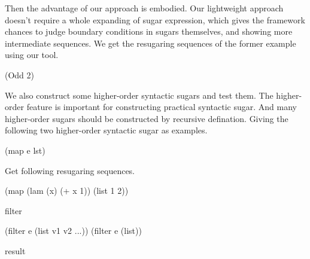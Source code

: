 Then the advantage of our approach is embodied. Our lightweight approach doesn't require a whole expanding of sugar expression, which gives the framework chances to judge boundary conditions in sugars themselves, and showing more intermediate sequences. We get the resugaring sequences of the former example using our tool.
\begin{Codes}
    (Odd 2)
\end{Codes}
				

We also construct some higher-order syntactic sugars and test them. The higher-order feature is important for constructing practical syntactic sugar. And many higher-order sugars should be constructed by recursive defination. Giving the following two higher-order syntactic sugar as examples.
\begin{Codes}
    (map e lst)
\end{Codes}
Get following resugaring sequences.
\begin{Codes}
    (map (lam (x) (+ x 1)) (list 1 2))
\end{Codes}
filter
\begin{Codes}
   (filter e (list v1 v2 ...))
   (filter e (list)) 
\end{Codes}
result

